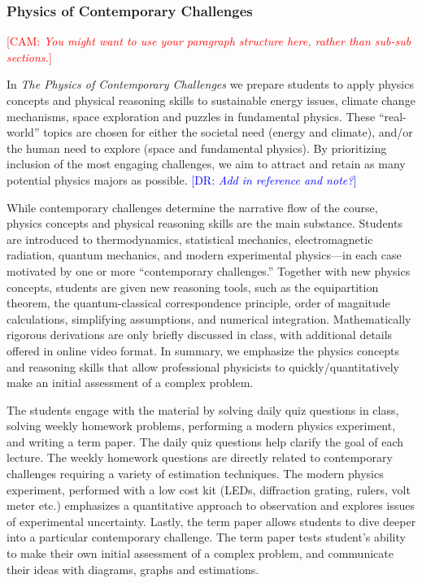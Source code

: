 \documentclass[english,aps,pra,reprint,noshowpacs,superscriptaddress]{revtex4-1}
\newcommand\corinnesays[1]{\textcolor{red}{[\sc CAM: {\em#1}]}}
\newcommand\davidsays[1]{\textcolor{blue}{[\sc DR: {\em#1}]}}
\begin{document}
\subsubsection{Physics of Contemporary Challenges}
\corinnesays{You might want to use your paragraph structure here, rather than sub-sub sections.}

In \emph{The Physics of Contemporary Challenges} we prepare students to
apply physics concepts and physical reasoning skills to sustainable
energy issues, climate change mechanisms, space exploration and
puzzles in fundamental physics. These ``real-world'' topics are chosen
for either the societal need (energy and climate), and/or the human
need to explore (space and fundamental physics). By prioritizing
inclusion of the most engaging challenges, we aim to attract and
retain as many potential physics majors as possible.
\davidsays{Add in reference and note?}

While contemporary challenges determine the narrative flow of the
course, physics concepts and physical reasoning skills are the main
substance. Students are introduced to thermodynamics, statistical
mechanics, electromagnetic radiation, quantum mechanics, and modern
experimental physics---in each case motivated by one or more
``contemporary challenges.'' Together with new physics concepts,
students are given new reasoning tools, such as the equipartition
theorem, the quantum-classical correspondence principle, order of
magnitude calculations, simplifying assumptions, and numerical
integration. Mathematically rigorous derivations are only briefly
discussed in class, with additional details offered in online video
format. In summary, we emphasize the physics concepts and reasoning
skills that allow professional physicists to quickly/quantitatively
make an initial assessment of a complex problem.

The students engage with the material by solving daily quiz questions
in class, solving weekly homework problems, performing a modern
physics experiment, and writing a term paper. The daily quiz questions
help clarify the goal of each lecture. The weekly homework questions
are directly related to contemporary challenges requiring a variety
of estimation techniques. The modern physics experiment, performed
with a low cost kit (LEDs, diffraction grating, rulers, volt meter
etc.) emphasizes a quantitative approach to observation and explores
issues of experimental uncertainty. Lastly, the term paper allows
students to dive deeper into a particular contemporary challenge. The
term paper tests student's ability to make their own initial
assessment of a complex problem, and communicate their ideas with
diagrams, graphs and estimations.
\end{document}
